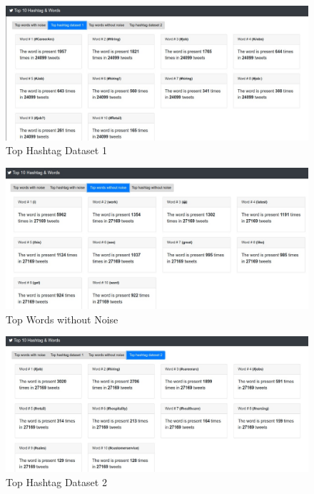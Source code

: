 \documentclass{article}
\newcommand*\setcaptioncitation[1]{\def\captioncitation{\textit{Source:}~#1}}
\let\captioncitation\relax
\begin{document}
        \begin{figure}[H]
            \centering 
            \includegraphics[width=1\linewidth]{./img/tophashtagdataset1.jpeg}
            \setcaptioncitation{self-made}
            \caption{Top Hashtag Dataset 1}
            \label{fig: Top Hashtag Dataset 1}
        \end{figure}
        
        \begin{figure}[H]
            \centering 
            \includegraphics[width=1\linewidth]{./img/topwordswithoutnoise.jpeg}
            \setcaptioncitation{self-made}
            \caption{Top Words without Noise}
            \label{fig: Top Words without Noise}
        \end{figure}
        
        \begin{figure}[H]
            \centering 
            \includegraphics[width=1\linewidth]{./img/tophashtagdataset2.jpeg}
            \setcaptioncitation{self-made}
            \caption{Top Hashtag Dataset 2}
            \label{fig: Top Hashtag Dataset 2}
        \end{figure}
		      
\end{document}
